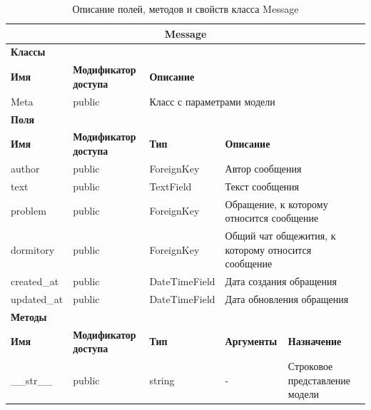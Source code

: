 \documentclass{../includes/TechDoc}
\begin{document}
    \begin{table}[ht]
        \caption{\label{tab:class-Message-table}Описание полей, методов и свойств класса Message}
        \centering
        \begin{tabular}{|p{3.2cm}|p{3cm}|p{2.9cm}|p{2.9cm}|p{4cm}|}
            \hline
            \multicolumn{5}{|c|}{Message} \\ \hline
            \multicolumn{5}{|l|}{\textbf{Классы}} \\ \hline
            \textbf{Имя} & \textbf{Модификатор доступа} & \multicolumn{3}{p{9.8cm}|}{\textbf{Описание}} \\ \hline
            Meta & public & \multicolumn{3}{p{9.8cm}|}{Класс с параметрами модели} \\ \hline
            \multicolumn{5}{|l|}{\textbf{Поля}} \\ \hline
            \textbf{Имя} & \textbf{Модификатор доступа} & \textbf{Тип} & \multicolumn{2}{p{6.9cm}|}{\textbf{Описание}} \\ \hline
            author & public & ForeignKey & \multicolumn{2}{p{6.9cm}|}{Автор сообщения} \\ \hline
            text & public & TextField & \multicolumn{2}{p{6.9cm}|}{Текст сообщения} \\ \hline
            problem & public & ForeignKey & \multicolumn{2}{p{6.9cm}|}{Обращение, к которому относится сообщение} \\ \hline
            dormitory & public & ForeignKey & \multicolumn{2}{p{6.9cm}|}{Общий чат общежития, к которому относится сообщение} \\ \hline
            created\_at & public & DateTimeField & \multicolumn{2}{p{6.9cm}|}{Дата создания обращения} \\ \hline
            updated\_at & public & DateTimeField & \multicolumn{2}{p{6.9cm}|}{Дата обновления обращения} \\ \hline
            \multicolumn{5}{|l|}{\textbf{Методы}} \\ \hline
            \textbf{Имя} & \textbf{Модификатор доступа} & \textbf{Тип} & \textbf{Аргументы} & \textbf{Назначение} \\ \hline
            \_\_str\_\_ & public & string & - & Строковое представление модели \\ \hline
        \end{tabular}
    \end{table}
\end{document}
